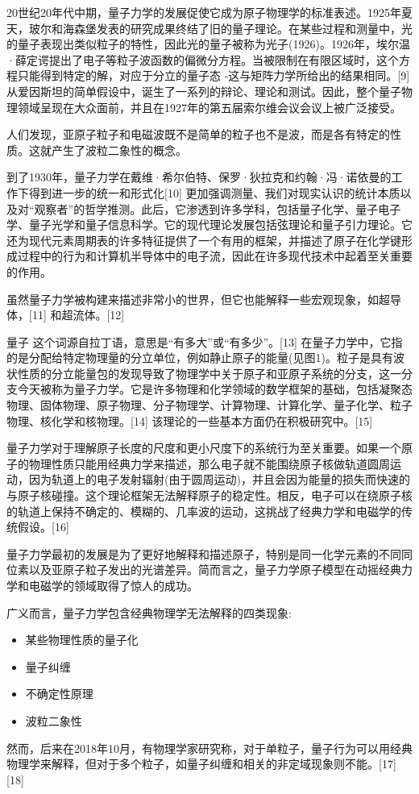 20世纪20年代中期，量子力学的发展促使它成为原子物理学的标准表述。1925年夏天，玻尔和海森堡发表的研究成果终结了旧的量子理论。在某些过程和测量中，光的量子表现出类似粒子的特性，因此光的量子被称为光子(1926)。1926年，埃尔温·薛定谔提出了电子等粒子波函数的偏微分方程。当被限制在有限区域时，这个方程只能得到特定的解，对应于分立的量子态 -这与矩阵力学所给出的结果相同。[9] 从爱因斯坦的简单假设中，诞生了一系列的辩论、理论和测试。因此，整个量子物理领域呈现在大众面前，并且在1927年的第五届索尔维会议会议上被广泛接受。

人们发现，亚原子粒子和电磁波既不是简单的粒子也不是波，而是各有特定的性质。这就产生了波粒二象性的概念。

到了1930年，量子力学在戴维·希尔伯特、保罗·狄拉克和约翰·冯·诺依曼的工作下得到进一步的统一和形式化[10] 更加强调测量、我们对现实认识的统计本质以及对“观察者”的哲学推测。此后，它渗透到许多学科，包括量子化学、量子电子学、量子光学和量子信息科学。它的现代理论发展包括弦理论和量子引力理论。它还为现代元素周期表的许多特征提供了一个有用的框架，并描述了原子在化学键形成过程中的行为和计算机半导体中的电子流，因此在许多现代技术中起着至关重要的作用。

虽然量子力学被构建来描述非常小的世界，但它也能解释一些宏观现象，如超导体，[11] 和超流体。[12]

量子 这个词源自拉丁语，意思是“有多大”或“有多少”。[13] 在量子力学中，它指的是分配给特定物理量的分立单位，例如静止原子的能量(见图1)。粒子是具有波状性质的分立能量包的发现导致了物理学中关于原子和亚原子系统的分支，这一分支今天被称为量子力学。它是许多物理和化学领域的数学框架的基础，包括凝聚态物理、固体物理、原子物理、分子物理学、计算物理、计算化学、量子化学、粒子物理、核化学和核物理。[14] 该理论的一些基本方面仍在积极研究中。[15]

量子力学对于理解原子长度的尺度和更小尺度下的系统行为至关重要。如果一个原子的物理性质只能用经典力学来描述，那么电子就不能围绕原子核做轨道圆周运动，因为轨道上的电子发射辐射(由于圆周运动)，并且会因为能量的损失而快速的与原子核碰撞。这个理论框架无法解释原子的稳定性。相反，电子可以在绕原子核的轨道上保持不确定的、模糊的、几率波的运动，这挑战了经典力学和电磁学的传统假设。[16]

量子力学最初的发展是为了更好地解释和描述原子，特别是同一化学元素的不同同位素以及亚原子粒子发出的光谱差异。简而言之，量子力学原子模型在动摇经典力学和电磁学的领域取得了惊人的成功。

广义而言，量子力学包含经典物理学无法解释的四类现象:
\begin{itemize}
\item 某些物理性质的量子化
\item 量子纠缠
\item 不确定性原理
\item 波粒二象性
\end{itemize}
然而，后来在2018年10月，有物理学家研究称，对于单粒子，量子行为可以用经典物理学来解释，但对于多个粒子，如量子纠缠和相关的非定域现象则不能。[17][18]

